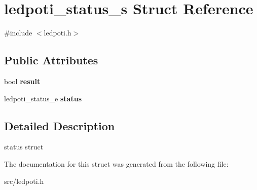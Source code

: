 \hypertarget{structledpoti__status__s}{}\section{ledpoti\+\_\+status\+\_\+s Struct Reference}
\label{structledpoti__status__s}


{\ttfamily \#include $<$ledpoti.\+h$>$}

\subsection*{Public Attributes}
\begin{DoxyCompactItemize}
\item 
\mbox{\label{structledpoti__status__s_a7411a6a4ef29fecee9ac39da322dc0cf}} 
bool {\bfseries result}
\item 
\mbox{\label{structledpoti__status__s_a99ecd576703b3df78b55322fa6152885}} 
ledpoti\+\_\+status\+\_\+e {\bfseries status}
\end{DoxyCompactItemize}


\subsection{Detailed Description}
status struct 

The documentation for this struct was generated from the following file\+:\begin{DoxyCompactItemize}
\item 
src/ledpoti.\+h\end{DoxyCompactItemize}
